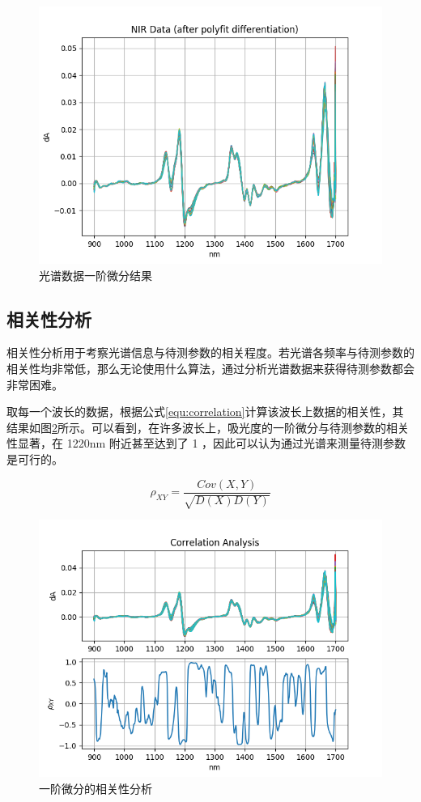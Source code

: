 \documentclass[a4paper]{article}
\begin{document}
			\begin{figure}
				\centering
				\includegraphics[width=\linewidth]{../img/diff}
				\caption{光谱数据一阶微分结果}
				\label{fig:diff}
			\end{figure}
			
		\subsection{相关性分析}
			相关性分析用于考察光谱信息与待测参数的相关程度。若光谱各频率与待测参数的相关性均非常低，那么无论使用什么算法，通过分析光谱数据来获得待测参数都会非常困难。
			
			取每一个波长的数据，根据公式\eqref{equ:correlation}计算该波长上数据的相关性，其结果如图\ref{fig:correlation}所示。可以看到，在许多波长上，吸光度的一阶微分与待测参数的相关性显著，在 1220nm 附近甚至达到了 1 ，因此可以认为通过光谱来测量待测参数是可行的。
			
			\begin{equation}\label{equ:correlation}
				\rho_{XY} = \frac{Cov(X, Y)}{\sqrt{D(X)D(Y)}}
			\end{equation}
			\begin{figure}
				\centering
				\includegraphics[width=\linewidth]{../img/correlation}
				\caption{一阶微分的相关性分析}
				\label{fig:correlation}
			\end{figure}
			
\end{document}
